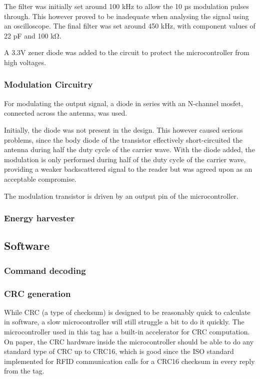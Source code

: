 The filter was initially set around 100 kHz to allow the 10 µs modulation pulses\cite{rfid-iso} through.
This however proved to be inadequate when analysing the signal using an oscilloscope.
The final filter was set around 450 kHz, with component values of 22 pF and 100 kΩ.

A 3.3V zener diode was added to the circuit to protect the microcontroller from high voltages.

\subsubsection{Modulation Circuitry}
For modulating the output signal, a diode in series with an N-channel mosfet, connected across the antenna, was used.

Initially, the diode was not present in the design.
This however caused serious problems, since the body diode of the transistor effectively short-circuited the antenna during half the duty cycle of the carrier wave.
With the diode added, the modulation is only performed during half of the duty cycle of the carrier wave, providing a weaker backscattered signal to the reader but was agreed upon as an acceptable compromise.

The modulation transistor is driven by an output pin of the microcontroller.

\subsubsection{Energy harvester}


\subsection{Software}

\subsubsection{Command decoding}
\subsubsection{CRC generation}
While CRC (a type of checksum) is designed to be reasonably quick to calculate in software,
a slow microcontroller will still struggle a bit to do it quickly. The microcontroller used in this
tag has a built-in accelerator for CRC computation. On paper, the CRC hardware inside the microcontroller
should be able to do any standard type of CRC up to CRC16, which is good since the ISO standard
implemented for RFID communication calls for a CRC16 checksum in every reply from the tag.

